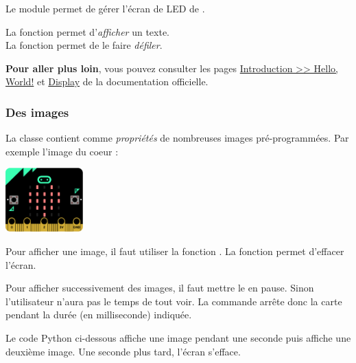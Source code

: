 Le module  permet de gérer l'écran de LED de \mb.\par
La fonction  permet d'\emph{afficher} un texte.\\
La fonction  permet de le faire \emph{défiler}.

\begin{methode}
\end{methode}

\begin{remarque}
\textbf{Pour aller plus loin}, vous pouvez consulter les pages \href{https://microbit-micropython.readthedocs.io/fr/latest/tutorials/hello.html}{Introduction >> Hello, World!} et \href{https://microbit-micropython.readthedocs.io/fr/latest/display.html}{Display} de la documentation officielle.
\end{remarque}


\subsubsection{Des images}

La classe  contient comme \emph{propriétés} de nombreuses images pré-programmées. Par exemple l'image du coeur : 

\begin{center}
    \includegraphics[width=3cm]{res/mbpy-init-heart.png}
\end{center}

Pour afficher une image, il faut utiliser la fonction .
La fonction  permet d'effacer l'écran.

Pour afficher successivement des images, il faut mettre le \mb en pause. Sinon l'utilisateur n'aura pas le temps de tout voir. La commande  arrête donc la carte pendant la durée (en milliseconde) indiquée.

\begin{methode}
Le code Python ci-dessous affiche une image pendant une seconde puis affiche une deuxième image. Une seconde plus tard, l'écran s'efface.

\end{methode}

